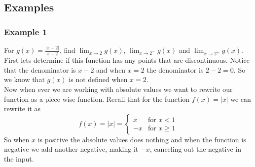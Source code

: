 \documentclass[12pt]{article}
\begin{document}

\subsection{Examples}
\label{ssec:examples}
\subsubsection{Example 1}
\label{ex:abs}
For $g(x)=\frac{|x-2|}{x-2}$, find $\displaystyle{\lim_{x\to 2}g(x)}$, $\displaystyle{\lim_{x\to 2^{-}}g(x)}$ and $\displaystyle{\lim_{x\to 2^{+}}g(x)}$.\\ 
First lets determine if this function has any points that are discontinuous. Notice that the denominator is $x-2$ and when $x=2$ the denominator is $2-2=0$. So we know that $g(x)$ is not defined when $x=2$.\\

Now when ever we are working with absolute values we want to rewrite our function as a piece wise function. Recall that for the function $f(x)=|x|$ we can rewrite it as 
$$f(x)=|x|=\begin{cases}
        x & \text{for } x < 1\\
        -x & \text{for } x \geq 1  
    \end{cases}$$
So when $x$ is positive the absolute values does nothing and when the function is negative we add another negative, making it $-x$, canceling out the negative in the input.\\
\end{document}
